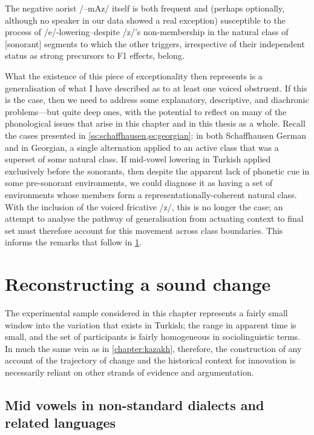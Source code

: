 The negative aorist /–mAz/ itself is both frequent and (perhaps optionally, although no speaker in our data showed a real exception) susceptible to the process of /e/-lowering--despite /z/'s non-membership in the natural class of [sonorant] segments to which the other triggers, irrespective of their independent status as strong precursors to F1 effects, belong.

What the existence of this piece of exceptionality then represents is a generalisation of what I have described as  to at least one voiced obstruent. If this is the case, then we need to address some explanatory, descriptive, and diachronic problems---but quite deep ones, with the potential to reflect on many of the phonological issues that arise in this chapter and in this thesis as a whole. Recall the cases presented in \cref{ss:schaffhausen,ss:georgian}: in both Schaffhausen German and in Georgian, a single alternation applied to an active class that was a superset of some natural class. If mid-vowel lowering in Turkish applied exclusively before the sonorants, then despite the apparent lack of phonetic cue in some pre-sonorant environments, we could diagnose it as having a set of environments whose members form a representationally-coherent natural class. With the inclusion of the voiced fricative /z/, this is no longer the case; an attempt to analyse the pathway of generalisation from actuating context to final set must therefore account for this movement across class boundaries. This informs the remarks that follow in \cref{s:tr_diachrony}.

\section{Reconstructing a sound change}\label{s:tr_diachrony}

The experimental sample considered in this chapter represents a fairly small window into the variation that exists in Turkish; the range in apparent time is small, and the set of participants is fairly homogeneous in sociolinguistic terms. In much the same vein as in \cref{chapter:kazakh}, therefore, the construction of any account of the trajectory of change and the historical context for innovation is necessarily reliant on other strands of evidence and argumentation.

\subsection{Mid vowels in non-standard dialects and related languages}\label{ss:dialectology}

